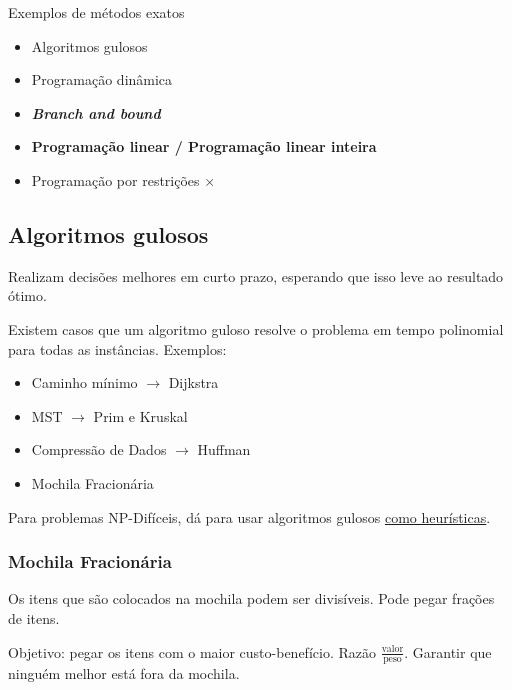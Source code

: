 Exemplos de métodos exatos

\begin{itemize}
    \item Algoritmos gulosos
    \item Programação dinâmica
    \item \textbf{\textit{Branch and bound}}
    \item \textbf{Programação linear / Programação linear inteira}
    \item Programação por restrições $\times$
\end{itemize}

\subsection{Algoritmos gulosos}

Realizam decisões melhores em curto prazo, esperando que isso leve ao resultado ótimo.

Existem casos que um algoritmo guloso resolve o problema em tempo polinomial para todas as instâncias. Exemplos:

\begin{itemize}
    \item Caminho mínimo $\to$ Dijkstra
    \item MST $\to$ Prim e Kruskal
    \item Compressão de Dados $\to$ Huffman
    \item Mochila Fracionária
\end{itemize}

Para problemas NP-Difíceis, dá para usar algoritmos gulosos \underline{como heurísticas}.

\subsubsection{Mochila Fracionária}

Os itens que são colocados na mochila podem ser divisíveis. Pode pegar frações de itens.

Objetivo: pegar os itens com o maior custo-benefício. Razão $\frac{\mathrm{valor}}{\mathrm{peso}}$. Garantir que ninguém melhor está fora da mochila.

